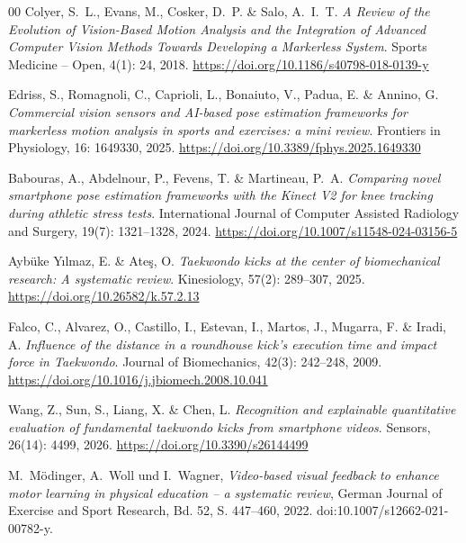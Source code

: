 \documentclass[intern]{cgMA}
\begin{document}
\appendix

\begin{thebibliography}{00}
Colyer, S.~L., Evans, M., Cosker, D.~P. \& Salo, A.~I.~T.
\textit{A Review of the Evolution of Vision-Based Motion Analysis
and the Integration of Advanced Computer Vision Methods
Towards Developing a Markerless System}.
Sports Medicine -- Open, 4(1): 24, 2018.
\href{https://doi.org/10.1186/s40798-018-0139-y}{https://doi.org/10.1186/s40798-018-0139-y}

Edriss, S., Romagnoli, C., Caprioli, L., Bonaiuto, V.,
Padua, E. \& Annino, G.
\textit{Commercial vision sensors and AI-based pose
estimation frameworks for markerless motion analysis
in sports and exercises: a mini review}.
Frontiers in Physiology, 16: 1649330, 2025.
\href{https://doi.org/10.3389/fphys.2025.1649330}{https://doi.org/10.3389/fphys.2025.1649330}

Babouras, A., Abdelnour, P., Fevens, T. \& Martineau, P.~A.
\textit{Comparing novel smartphone pose estimation frameworks
with the Kinect V2 for knee tracking during athletic stress tests}.
International Journal of Computer Assisted Radiology and Surgery,
19(7): 1321--1328, 2024.
\href{https://doi.org/10.1007/s11548-024-03156-5}{https://doi.org/10.1007/s11548-024-03156-5}

Aybüke Yılmaz, E. \& Ateş, O.
\textit{Taekwondo kicks at the center of biomechanical
research: A systematic review}.
Kinesiology, 57(2): 289--307, 2025.
\href{https://doi.org/10.26582/k.57.2.13}{https://doi.org/10.26582/k.57.2.13}

Falco, C., Alvarez, O., Castillo, I., Estevan, I., Martos, J.,
Mugarra, F. \& Iradi, A.
\textit{Influence of the distance in a roundhouse kick's
execution time and impact force in Taekwondo}.
Journal of Biomechanics, 42(3): 242--248, 2009.
\href{https://doi.org/10.1016/j.jbiomech.2008.10.041}{https://doi.org/10.1016/j.jbiomech.2008.10.041}

Wang, Z., Sun, S., Liang, X. \& Chen, L.
\textit{Recognition and explainable quantitative evaluation of
fundamental taekwondo kicks from smartphone videos}.
Sensors, 26(14): 4499, 2026.
\href{https://doi.org/10.3390/s26144499}{https://doi.org/10.3390/s26144499}

M.~Mödinger, A.~Woll und I.~Wagner,
\textit{Video-based visual feedback to enhance motor learning in physical education -- a systematic review},
German Journal of Exercise and Sport Research, Bd. 52, S. 447--460, 2022.
doi:10.1007/s12662-021-00782-y.


\end{thebibliography}
\end{document}
